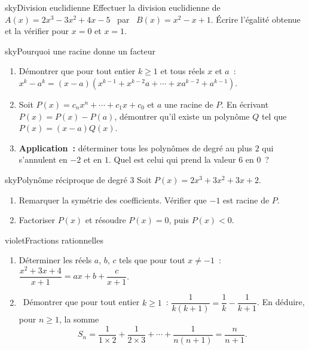 \begin{exo}{sky}{Division euclidienne }
Effectuer la division euclidienne de \ $A(x)=2x^3-3x^2+4x-5$ \ par \ $B(x)=x^2-x+1$. Écrire l'égalité obtenue et la vérifier pour $x=0$ et $x=1$.
\end{exo}

\begin{exo}{sky}{Pourquoi une racine donne un facteur \demo\ }
\begin{enumerate}
  \item Démontrer que pour tout entier $k\geq1$ et tous réels $x$ et $a$~: \ $x^k-a^k=(x-a)\left(x^{k-1}+x^{k-2}a+\cdots+xa^{k-2}+a^{k-1}\right)$.
  \item Soit $P(x)=c_nx^n+\cdots+c_1x+c_0$ et $a$ une racine de $P$. En écrivant $P(x)=P(x)-P(a)$, démontrer qu'il existe un polynôme $Q$ tel que $P(x)=(x-a)Q(x)$.
  \item \textbf{Application~:} déterminer tous les polynômes de degré au plus $2$ qui s'annulent en $-2$ et en $1$. Quel est celui qui prend la valeur $6$ en $0$~?
\end{enumerate}
\end{exo}

\begin{exo}{sky}{Polynôme réciproque de degré 3 }
Soit $P(x)=2x^3+3x^2+3x+2$.
\begin{enumerate}
  \item Remarquer la symétrie des coefficients. Vérifier que $-1$ est racine de $P$.
  \item Factoriser $P(x)$ et résoudre $P(x)=0$, puis $P(x)<0$.
\end{enumerate}
\end{exo}


\begin{exo}{violet}{Fractions rationnelles \ \demo}
\begin{enumerate}
  \item Déterminer les réels $a$, $b$, $c$ tels que pour tout $x\neq-1$~: \ $\dfrac{x^2+3x+4}{x+1}=ax+b+\dfrac{c}{x+1}$.
  \item \demo\ Démontrer que pour tout entier $k\geq1$~: $\dfrac1{k(k+1)}=\dfrac1k-\dfrac1{k+1}$. En déduire, pour $n\geq1$, la somme
  \[ S_n=\frac1{1\times2}+\frac1{2\times3}+\cdots+\frac1{n(n+1)}=\frac{n}{n+1}. \]
\end{enumerate}
\end{exo}

